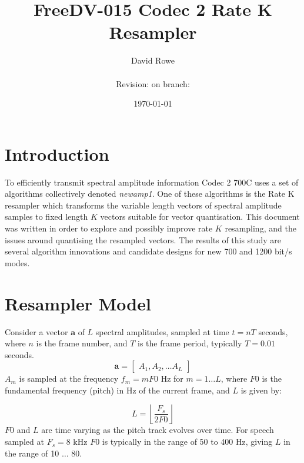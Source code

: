 \documentclass{article}
\title{FreeDV-015 Codec 2 Rate K Resampler}
\author{David Rowe\\ \\ Revision: {\gitrevision} on branch: {\branch}}
\date{\today}
\begin{document}
\maketitle

\section{Introduction}

To efficiently transmit spectral amplitude information Codec 2 700C uses a set of algorithms collectively denoted \emph{newamp1}. One of these algorithms is the Rate K resampler which transforms the variable length vectors of spectral amplitude samples to fixed length $K$ vectors suitable for vector quantisation.  This document was written in order to explore and possibly improve rate $K$ resampling, and the issues around quantising the resampled vectors.  The results of this study are several algorithm innovations and candidate designs for new 700 and 1200 bit/s modes.

\section{Resampler Model}

Consider a vector $\mathbf{a}$ of $L$ spectral amplitudes, sampled at time $t=nT$ seconds, where $n$ is the frame number, and $T$ is the frame period, typically $T=0.01$ seconds. 
\begin{equation}
\mathbf{a} = \begin{bmatrix} A_1, A_2, \ldots A_L \end{bmatrix} 
\end{equation}
$A_m$ is sampled at the frequency $f_m=mF0$ Hz for $m=1 \ldots L$, where $F0$ is the fundamental frequency (pitch) in Hz of the current frame, and $L$ is given by:

\begin{equation}
L=\left \lfloor \frac{F_s}{2F0} \right \rfloor
\end{equation}
$F0$ and $L$ are time varying as the pitch track evolves over time. For speech sampled at $F_s=8$ kHz $F0$ is typically in the range of 50 to 400 Hz, giving $L$ in the range of 10 $\ldots$ 80. \\
\end{document}
